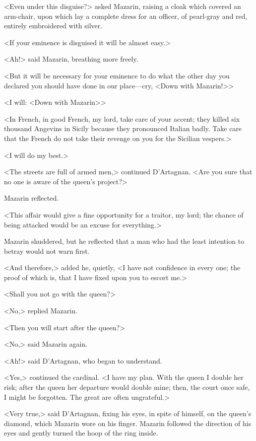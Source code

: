 <Even under this disguise?> asked Mazarin, raising a cloak which covered an arm-chair, upon which lay a complete dress for an officer, of pearl-gray and red, entirely embroidered with silver.

<If your eminence is disguised it will be almost easy.>

<Ah!> said Mazarin, breathing more freely.

<But it will be necessary for your eminence to do what the other day you declared you should have done in our place—cry, <Down with Mazarin!>>

<I will: <Down with Mazarin>>

<In French, in good French, my lord, take care of your accent; they killed six thousand Angevins in Sicily because they pronounced Italian badly. Take care that the French do not take their revenge on you for the Sicilian vespers.>

<I will do my best.>

<The streets are full of armed men,> continued D'Artagnan. <Are you sure that no one is aware of the queen's project?>

Mazarin reflected.

<This affair would give a fine opportunity for a traitor, my lord; the chance of being attacked would be an excuse for everything.>

Mazarin shuddered, but he reflected that a man who had the least intention to betray would not warn first.

<And therefore,> added he, quietly, <I have not confidence in every one; the proof of which is, that I have fixed upon you to escort me.>

<Shall you not go with the queen?>

<No,> replied Mazarin.

<Then you will start after the queen?>

<No,> said Mazarin again.

<Ah!> said D'Artagnan, who began to understand.

<Yes,> continued the cardinal. <I have my plan. With the queen I double her risk; after the queen her departure would double mine; then, the court once safe, I might be forgotten. The great are often ungrateful.>

<Very true,> said D'Artagnan, fixing his eyes, in spite of himself, on the queen's diamond, which Mazarin wore on his finger. Mazarin followed the direction of his eyes and gently turned the hoop of the ring inside.

